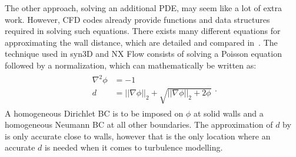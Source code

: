 The other approach, solving an additional PDE, may seem like a lot of extra work. However, CFD codes already provide functions and data structures required in solving such equations. There exists many different equations for approximating the wall distance, which are detailed and compared in~\cite{tucker2005computations,tucker2011hybrid,belyaev2015variational}. The technique used in syn3D and NX Flow consists of solving a Poisson equation followed by a normalization, which can mathematically be written as:
\begin{align}
    \begin{split}
    \nabla^2\phi &= -1\\
    d &= ||\nabla\phi||_2 + \sqrt{
        ||\nabla\phi||_2 + 2\phi
    }
    \end{split}
    \label{eq:poissondist}.
\end{align}
A homogeneous Dirichlet BC is to be imposed on $\phi$ at solid walls and a homogeneous Neumann BC at all other boundaries. The approximation of $d$ by~ is only accurate close to walls, however that is the only location where an accurate $d$ is needed when it comes to turbulence modelling.

